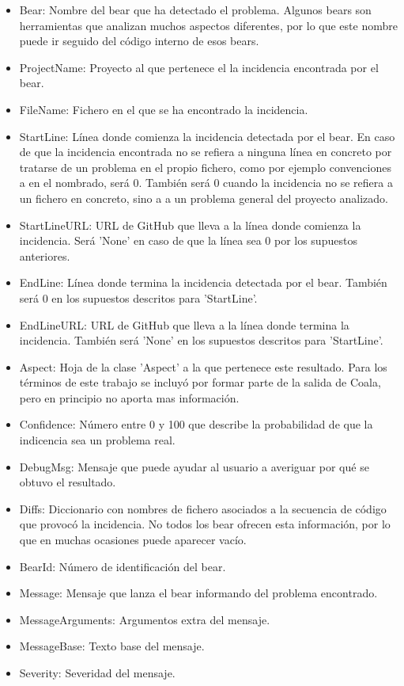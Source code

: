\documentclass[a4paper, 12pt]{book}
\begin{document}
\begin{itemize}
          \item Bear: Nombre del bear que ha detectado el problema. Algunos bears son herramientas que analizan muchos aspectos diferentes, por lo que este nombre puede ir seguido del código interno de esos bears.
          \item ProjectName: Proyecto al que pertenece el la incidencia encontrada por el bear.
          \item FileName: Fichero en el que se ha encontrado la incidencia.
          \item StartLine: Línea donde comienza la incidencia detectada por el bear. En caso de que la incidencia encontrada no se refiera a ninguna línea en concreto por tratarse de un problema en el propio fichero, como por ejemplo convenciones a en el nombrado, será 0. También será 0 cuando la incidencia no se refiera a un fichero en concreto, sino a a un problema general del proyecto analizado.
          \item StartLineURL: URL de GitHub que lleva a la línea donde comienza la incidencia. Será 'None' en caso de que la línea sea 0 por los supuestos anteriores.
          \item EndLine: Línea donde termina la incidencia detectada por el bear. También será 0 en los supuestos descritos para 'StartLine'.
          \item EndLineURL: URL de GitHub que lleva a la línea donde termina la incidencia. También será 'None' en los supuestos descritos para 'StartLine'.
          \item Aspect: Hoja de la clase 'Aspect' a la que pertenece este resultado. Para los términos de este trabajo se incluyó por formar parte de la salida de Coala, pero en principio no aporta mas información.
          \item Confidence: Número entre 0 y 100 que describe la probabilidad de que la indicencia sea un problema real.
          \item DebugMsg: Mensaje que puede ayudar al usuario a averiguar por qué se obtuvo el resultado.
          \item Diffs: Diccionario con nombres de fichero asociados a la secuencia de código que provocó la incidencia. No todos los bear ofrecen esta información, por lo que en muchas ocasiones puede aparecer vacío.
          \item BearId: Número de identificación del bear.
          \item Message: Mensaje que lanza el bear informando del problema encontrado.
          \item MessageArguments: Argumentos extra del mensaje.
          \item MessageBase: Texto base del mensaje.
          \item Severity: Severidad del mensaje.
\end{itemize}
\end{document}
